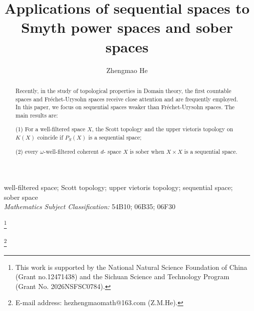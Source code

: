 \documentclass[preprint,12pt]{elsarticle}
\numberwithin{equation}{section}
\newcommand\blfootnote[1]{%
\begingroup
\renewcommand\thefootnote{}\footnote{#1}%
\addtocounter{footnote}{-1}%
\endgroup
}
\begin{document}
\begin{frontmatter}



\title{Applications of sequential spaces to Smyth power spaces and sober spaces}


\author{Zhengmao He}
\address{School of Sciences, Southwest Petroleum University,Chengdu 610500, China}
\begin{abstract} Recently, in the study of topological properties in Domain theory, the first countable spaces and Fr\'echet-Urysohn spaces receive close attention and are frequently employed. In this paper, we focus on sequential spaces weaker than Fr\'echet-Urysohn spaces. The main results are:

(1) For a well-filtered space $X$, the Scott topology and the upper vietoris topology on $K(X)$ coincide if $P_{S}(X)$ is a sequential space;

(2) every $\omega$-well-filtered coherent $d$- space $X$ is sober when $X\times X$ is a sequential space.
\end{abstract}
\begin{keyword} well-filtered space; Scott topology; upper vietoris topology; sequential space; sober space\\
\vspace*{0.2cm}
{\em Mathematics Subject Classification:} 54B10; 06B35; 06F30
\end{keyword}


\end{frontmatter}
\blfootnote{This work is supported by the National Natural Science Foundation of China (Grant no.12471438) and the Sichuan Science and Technology Program (Grant No. 2026NSFSC0784).}
\blfootnote{E-mail address: hezhengmaomath@163.com (Z.M.He).}
\end{document}
